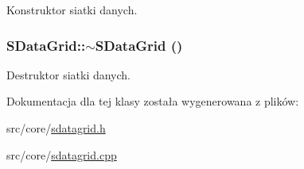 Konstruktor siatki danych. \hypertarget{classSDataGrid_51645b217b4c668e0e945cdbda1db3ec}{
\subsubsection[{$\sim$SDataGrid}]{\setlength{\rightskip}{0pt plus 5cm}SDataGrid::$\sim$SDataGrid ()}}
\label{classSDataGrid_51645b217b4c668e0e945cdbda1db3ec}


Destruktor siatki danych. 

Dokumentacja dla tej klasy została wygenerowana z plików:\begin{CompactItemize}
\item 
src/core/\hyperlink{sdatagrid_8h}{sdatagrid.h}\item 
src/core/\hyperlink{sdatagrid_8cpp}{sdatagrid.cpp}\end{CompactItemize}
